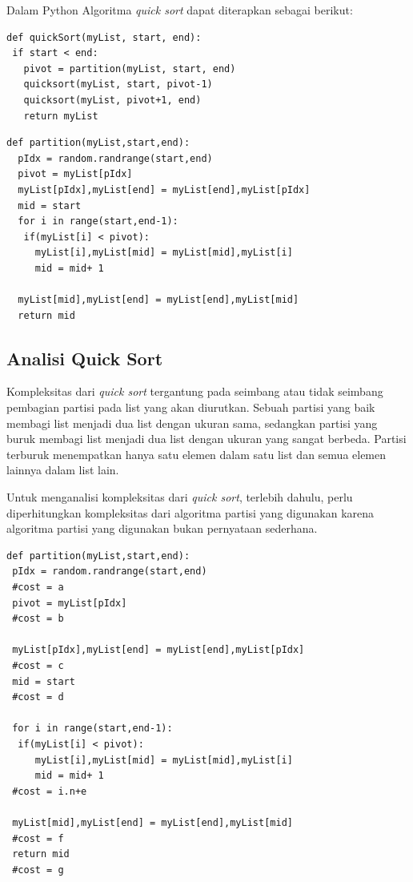\documentclass[12pt]{book}%
\begin{document}
\newpage{}
Dalam Python Algoritma \textit{quick sort} dapat diterapkan sebagai berikut:
\lstset{language=Python}
\label{lst:QuickSort}
\begin{lstlisting}[frame=single]
def quickSort(myList, start, end):
 if start < end:
   pivot = partition(myList, start, end)
   quicksort(myList, start, pivot-1)
   quicksort(myList, pivot+1, end)
   return myList
\end{lstlisting}

\lstset{language=Python}
\label{lst:Partition}
\begin{lstlisting}[frame=single]
def partition(myList,start,end):
  pIdx = random.randrange(start,end)
  pivot = myList[pIdx]
  myList[pIdx],myList[end] = myList[end],myList[pIdx]
  mid = start
  for i in range(start,end-1):
   if(myList[i] < pivot):    
	 myList[i],myList[mid] = myList[mid],myList[i]
	 mid = mid+ 1
	
  myList[mid],myList[end] = myList[end],myList[mid]
  return mid
\end{lstlisting}

\subsection{Analisi Quick Sort}
Kompleksitas dari \textit{quick sort} tergantung pada  seimbang atau tidak seimbang pembagian partisi pada list yang akan diurutkan. Sebuah partisi yang  baik membagi list menjadi dua list dengan ukuran sama, sedangkan partisi yang buruk membagi list menjadi dua list dengan ukuran yang sangat berbeda. Partisi terburuk menempatkan hanya satu elemen dalam satu list dan semua elemen lainnya dalam list lain. 

Untuk menganalisi kompleksitas dari \textit{quick sort}, terlebih dahulu, perlu diperhitungkan kompleksitas dari algoritma partisi yang digunakan karena algoritma partisi yang digunakan bukan pernyataan sederhana.

\lstset{language=Python}
\label{lst:Partition}
\begin{lstlisting}[frame=single]
def partition(myList,start,end):
 pIdx = random.randrange(start,end) 
 #cost = a
 pivot = myList[pIdx]
 #cost = b
 
 myList[pIdx],myList[end] = myList[end],myList[pIdx]
 #cost = c 
 mid = start
 #cost = d

 for i in range(start,end-1):
  if(myList[i] < pivot):
	 myList[i],myList[mid] = myList[mid],myList[i]
	 mid = mid+ 1
 #cost = i.n+e

 myList[mid],myList[end] = myList[end],myList[mid]
 #cost = f
 return mid
 #cost = g
\end{lstlisting}
\end{document}
